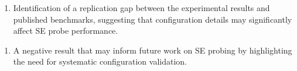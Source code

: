 \begin{enumerate}
\item Identification of a replication gap between the experimental results and published benchmarks, suggesting that configuration details may significantly affect SE probe performance.
\end{enumerate}

\begin{enumerate}
\item A negative result that may inform future work on SE probing by highlighting the need for systematic configuration validation.
\end{enumerate}
